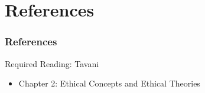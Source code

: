 \documentclass[dvipsnames]{beamer}
\theoremstyle{plain}
\begin{document}
\section*{References}

\begin{frame}
  \frametitle{References}

  \begin{block}{Required Reading: Tavani}
    \begin{itemize}
      \item Chapter 2: \alert{Ethical Concepts and Ethical Theories}
    \end{itemize}
  \end{block}
\end{frame}
\end{document}

